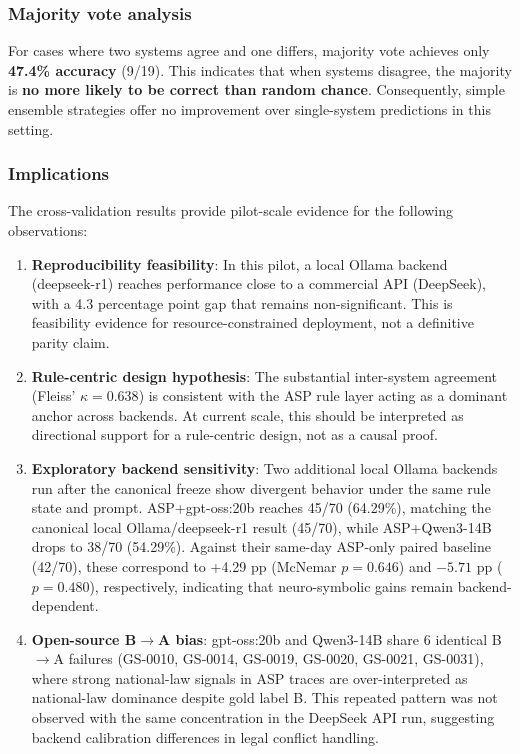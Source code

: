 \documentclass[11pt]{article}
\begin{document}
\subsubsection{Majority vote analysis}

For cases where two systems agree and one differs, majority vote achieves only \textbf{47.4\% accuracy} (9/19). This indicates that when systems disagree, the majority is \textbf{no more likely to be correct than random chance}. Consequently, simple ensemble strategies offer no improvement over single-system predictions in this setting.

\subsubsection{Implications}

The cross-validation results provide pilot-scale evidence for the following observations:
\begin{enumerate}[nosep]
  \item \textbf{Reproducibility feasibility}: In this pilot, a local Ollama backend (deepseek-r1) reaches performance close to a commercial API (DeepSeek), with a 4.3 percentage point gap that remains non-significant. This is feasibility evidence for resource-constrained deployment, not a definitive parity claim.
  \item \textbf{Rule-centric design hypothesis}: The substantial inter-system agreement (Fleiss' $\kappa = 0.638$) is consistent with the ASP rule layer acting as a dominant anchor across backends. At current scale, this should be interpreted as directional support for a rule-centric design, not as a causal proof.
  \item \textbf{Exploratory backend sensitivity}: Two additional local Ollama backends run after the canonical freeze show divergent behavior under the same rule state and prompt. ASP+gpt-oss:20b reaches 45/70 (64.29\%), matching the canonical local Ollama/deepseek-r1 result (45/70), while ASP+Qwen3-14B drops to 38/70 (54.29\%). Against their same-day ASP-only paired baseline (42/70), these correspond to +4.29 pp (McNemar $p=0.646$) and $-5.71$ pp ($p=0.480$), respectively, indicating that neuro-symbolic gains remain backend-dependent.
  \item \textbf{Open-source B$\rightarrow$A bias}: gpt-oss:20b and Qwen3-14B share 6 identical B$\rightarrow$A failures (GS-0010, GS-0014, GS-0019, GS-0020, GS-0021, GS-0031), where strong national-law signals in ASP traces are over-interpreted as national-law dominance despite gold label B. This repeated pattern was not observed with the same concentration in the DeepSeek API run, suggesting backend calibration differences in legal conflict handling.
\end{enumerate}
\end{document}
